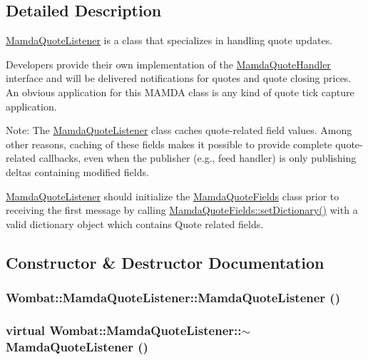 \subsection{Detailed Description}
\hyperlink{classWombat_1_1MamdaQuoteListener}{Mamda\-Quote\-Listener} is a class that specializes in handling quote updates. 

Developers provide their own implementation of the \hyperlink{classWombat_1_1MamdaQuoteHandler}{Mamda\-Quote\-Handler} interface and will be delivered notifications for quotes and quote closing prices. An obvious application for this MAMDA class is any kind of quote tick capture application.

Note: The \hyperlink{classWombat_1_1MamdaQuoteListener}{Mamda\-Quote\-Listener} class caches quote-related field values. Among other reasons, caching of these fields makes it possible to provide complete quote-related callbacks, even when the publisher (e.g., feed handler) is only publishing deltas containing modified fields.

\hyperlink{classWombat_1_1MamdaQuoteListener}{Mamda\-Quote\-Listener} should initialize the \hyperlink{classWombat_1_1MamdaQuoteFields}{Mamda\-Quote\-Fields} class prior to receiving the first message by calling \hyperlink{classWombat_1_1MamdaQuoteFields_b862fe0cd2d5874ef65f7f25703df471}{Mamda\-Quote\-Fields::set\-Dictionary()} with a valid dictionary object which contains Quote related fields. 



\subsection{Constructor \& Destructor Documentation}
\hypertarget{classWombat_1_1MamdaQuoteListener_56668574b9fb979163182cda591364e2}{
\subsubsection[MamdaQuoteListener]{\setlength{\rightskip}{0pt plus 5cm}Wombat::Mamda\-Quote\-Listener::Mamda\-Quote\-Listener ()}}
\label{classWombat_1_1MamdaQuoteListener_56668574b9fb979163182cda591364e2}


\hypertarget{classWombat_1_1MamdaQuoteListener_163781eff5c0f36fac9f5288ca1a6929}{
\subsubsection[$\sim$MamdaQuoteListener]{\setlength{\rightskip}{0pt plus 5cm}virtual Wombat::Mamda\-Quote\-Listener::$\sim$Mamda\-Quote\-Listener ()}}
\label{classWombat_1_1MamdaQuoteListener_163781eff5c0f36fac9f5288ca1a6929}




